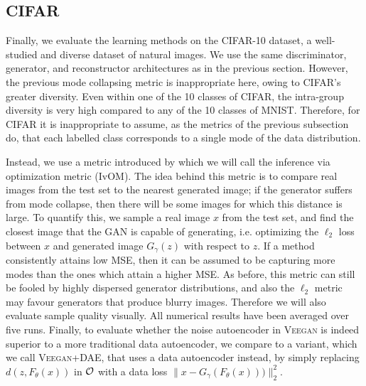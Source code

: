 \documentclass{article}
\newcommand{\acronym}{\textsc{Veegan}\xspace}
\begin{document}
\subsection{CIFAR}

Finally, we evaluate the learning methods on the CIFAR-10 dataset, a well-studied and diverse dataset of natural images. 
We use the same discriminator, generator, and reconstructor
architectures as in the previous section. 
However, the previous mode collapsing metric 
is inappropriate here, owing to CIFAR's greater diversity.
Even within one of the 10 classes of CIFAR,
the intra-group diversity is very high compared to any of the  10 classes of MNIST. Therefore, for CIFAR it is inappropriate to assume, as the metrics of the previous subsection do, that each
labelled class corresponds to a single mode of the data distribution.

Instead, we use a metric introduced by \citep{metz2016unrolled} which we will call the inference via optimization metric (IvOM). The idea behind this metric is to compare real images from the test
set to the nearest generated image; if the generator suffers
from mode collapse, then there will be some images for
which this distance is large.
To quantify this,
we sample a real image $x$ from the test set, and find
the closest image that the GAN is capable of generating, i.e.  optimizing the $\ell_2$ loss between $x$ and generated image $G_\gamma(z)$ with respect to $z$. 
 If a method consistently attains low MSE, then it can be assumed to be capturing more modes than the ones which attain a higher MSE. 
As before, this metric can still be fooled by highly dispersed generator distributions, and also the $\ell_2$ metric may favour
generators that produce blurry images. Therefore we will also
evaluate sample quality visually.
All numerical results have been averaged over five runs.
Finally, to evaluate whether the noise autoencoder
in \acronym is indeed superior to a more traditional data autoencoder, we compare to a variant, which we call \acronym+DAE, that uses
a data autoencoder instead, by simply replacing $d(z, F_\theta(x))$
in $\mathcal{O}$ with a data loss $\|x - G_\gamma(F_\theta(x)))\|^2_2$.


\end{document}

